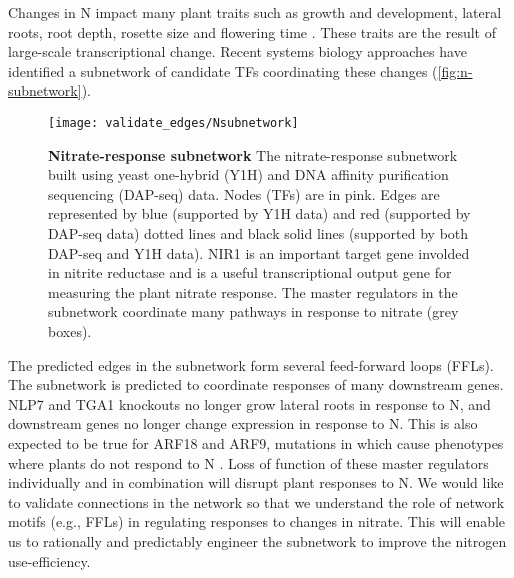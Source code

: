 \documentclass[../main.tex]{subfiles}
\begin{document}
Changes in N impact many plant traits such as growth and development, lateral roots, root depth, rosette size and flowering time \autocite{abalosPlantTraitbasedApproaches2019,castromarinNitrateRegulatesFloral2011}.
These traits are the result of large\hyp{}scale transcriptional change.
Recent systems biology approaches have identified a subnetwork of candidate TFs coordinating these changes \autocite{gaudinierTranscriptionalRegulationNitrogenassociated2018,varalaTemporalTranscriptionalLogic2018} (\autoref{fig:n-subnetwork}).

\begin{figure}[hbt!]
	\begin{center}
		\capstart
		\texttt{[image: validate\_edges/Nsubnetwork]}
		\caption{
			\textbf{Nitrate\hyp{}response subnetwork}
			The nitrate\hyp{}response subnetwork built using yeast one\hyp{}hybrid (Y1H) \autocite{gaudinierTranscriptionalRegulationNitrogenassociated2018} and DNA affinity purification sequencing (DAP-seq) \autocite{omalleyCistromeEpicistromeFeatures2016} data.
            Nodes (TFs) are in pink.
            Edges are represented by blue (supported by Y1H data) and red (supported by DAP-seq data) dotted lines and black solid lines (supported by both DAP-seq and Y1H data).
            NIR1 is an important target gene involded in nitrite reductase and is a useful transcriptional output gene for measuring the plant nitrate response.
            The master regulators in the subnetwork coordinate many pathways in response to nitrate (grey boxes).
			\label{fig:n-subnetwork}
		}
	\end{center}
\end{figure}

The predicted edges in the subnetwork form several feed\hyp{}forward loops (FFLs).
The subnetwork is predicted to coordinate responses of many downstream genes.
NLP7 and TGA1 knockouts no longer grow lateral roots in response to N, and downstream genes no longer change expression in response to N.
This is also expected to be true for ARF18 and ARF9, mutations in which cause phenotypes where plants do not respond to N \autocite{gaudinierTranscriptionalRegulationNitrogenassociated2018}.
Loss of function of these master regulators individually and in combination will disrupt plant responses to N.
We would like to validate connections in the network so that we understand the role of network motifs (e.g., FFLs) in regulating responses to changes in nitrate.
This will enable us to rationally and predictably engineer the subnetwork to improve the nitrogen use\hyp{}efficiency.
\end{document}
